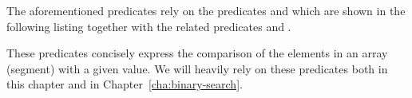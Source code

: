 


\clearpage

The aforementioned predicates rely on the predicates
 and  which
are shown in the following listing together with 
the related predicates  and .



These predicates concisely express the
comparison of the elements in an array (segment) with a given value.
We will heavily rely on these predicates both in this chapter and
in Chapter~\ref{cha:binary-search}.

\clearpage









